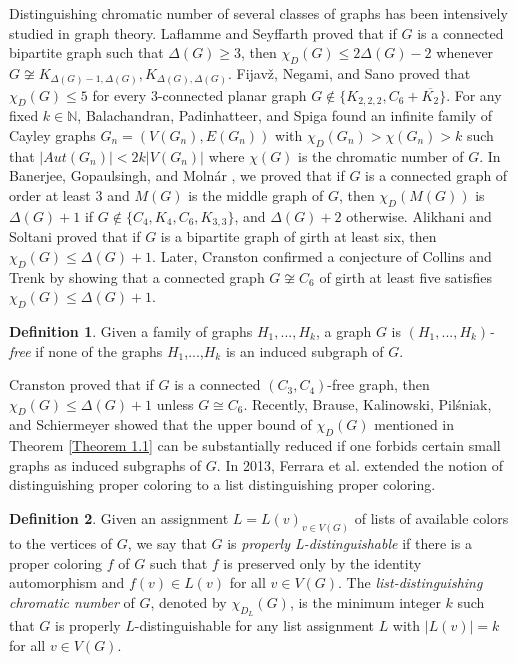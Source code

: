 \documentclass[12pt,reqno,a4paper]{amsart}
\theoremstyle{definition}
\newtheorem{defn}{Definition}[section]
\begin{document}
Distinguishing chromatic number of several classes of graphs has been intensively
studied in graph theory.
Laflamme and Seyffarth \cite{LS2009} proved that if $G$ is a connected bipartite graph such that $\Delta(G)\geq 3$, then 
$\chi_{D}(G)\leq 2\Delta(G)-2$ whenever $G\not\cong K_{\Delta(G)-1,\Delta(G)}, K_{\Delta(G),\Delta(G)}$.
Fijav\v{z}, Negami, and Sano \cite{FNS2011} proved that $\chi_{D}(G) \leq  5$ for every 3-connected planar graph $G \not\in \{K_{2,2,2}, C_{6} + \overline{K_{2}}\}$.
For any fixed $k \in \mathbb{N}$, Balachandran, Padinhatteer, and Spiga \cite{BPS2019} found an infinite family of Cayley graphs $G_{n}=(V(G_{n}), E(G_{n}))$ with $\chi_{D}(G_{n}) > \chi(G_{n})>k$ such that $\vert Aut(G_{n})\vert < 2k\vert V(G_{n})\vert$ where $\chi(G)$ is the chromatic number of $G$. 
In Banerjee, Gopaulsingh, and Moln\'{a}r \cite[Theorem 2.8]{BGMa2025}, we proved that if $G$ is a connected graph of order at least $3$ and $M(G)$ is the middle graph of $G$, then $\chi_{D}(M(G))$ is $\Delta(G)+1$ if $G\not\in\{C_{4}, K_{4}, C_{6}, K_{3,3}\}$, and $\Delta(G)+2$ otherwise. 
Alikhani and Soltani \cite{AS2016} proved that if $G$ is a bipartite graph of girth at least six, then   
$\chi_{D}(G)\leq \Delta(G)+1$. 
Later, Cranston \cite{Cra2018} confirmed a conjecture of Collins and Trenk by showing that a connected graph $G \not\cong C_{6}$ of girth at least five satisfies $\chi_{D}(G)\leq \Delta(G)+1$.

\begin{defn}\label{Definition 1.2}
Given a family of graphs $H_{1},..., H_{k}$, a graph $G$ is {\em $(H_{1},...,H_{k})$-free} if none of the graphs $H_{1}$,...,$H_{k}$ is an induced subgraph of $G$.    
\end{defn}

Cranston \cite{Cra2018} proved that if $G$ is a connected $(C_{3}, C_{4})$-free graph, then $\chi_{D}(G) \leq \Delta(G) + 1$ unless $G \cong C_{6}$. Recently, Brause, Kalinowski, Pil\'{s}niak, and Schiermeyer \cite{BKPS2025} showed that the upper bound of $\chi_{D}(G)$ mentioned in Theorem \ref{Theorem 1.1} can be substantially reduced if one forbids certain small graphs as induced subgraphs of $G$. 
In 2013, Ferrara et al. \cite{FGHSW2013} extended the notion of distinguishing proper coloring to a list distinguishing proper coloring. 

\begin{defn}\label{Definition 1.3}
Given an assignment $L = {L(v)}_{v\in V(G)}$ of lists of available colors to the vertices of $G$, we say that $G$ is {\em properly L-distinguishable} if there is a proper coloring $f$ of $G$ such that
$f$ is preserved only by the identity automorphism and
$f(v) \in L(v)$ for all $v\in V(G)$. 
The {\em list-distinguishing chromatic number} of $G$, denoted by $\chi_{D_{L}}(G)$, is the minimum integer $k$ such that $G$ is properly $L$-distinguishable for any list
assignment $L$ with $\vert L(v)\vert = k$ for all $v\in V(G)$.
\end{defn}
\end{document}
